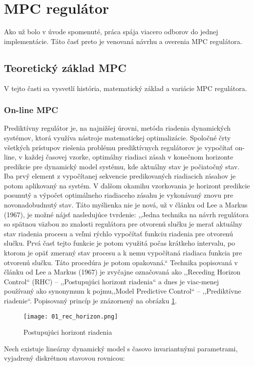 \section{MPC regulátor}
Ako už bolo v úvode spomenuté, práca spája viacero odborov do jednej implementácie. Táto časť preto je venovaná návrhu a overenia MPC regulátora.
\subsection{Teoretický základ MPC}
V tejto časti sa vysvetlí história, matematický základ a variácie MPC regulátora.
\subsubsection{On-line MPC}
Prediktívny regulátor je, na najnižšej úrovni, metóda riadenia dynamických systémov, ktorá využíva nástroje matematickej optimalizácie. Spoločné črty všetkých prístupov riešenia problému prediktívnych regulátorov je vypočítať on-line, v každej časovej vzorke,  optimálny riadiaci zásah v konečnom horizonte predikcie pre dynamický model systému, kde aktuálny stav je počiatočný stav. Iba prvý element z vypočítanej sekvencie predikovaných riadiacich zásahov je potom aplikovaný na systém. V ďalšom okamihu vzorkovania je horizont predikcie posunutý a výpočet optimálneho riadiaceho zásahu je vykonávaný znovu pre novonadobudnutý stav. Táto myšlienka nie je nová, už v článku od Lee a Markus (1967), je možné nájsť nasledujúce tvrdenie: ,,Jedna technika na návrh regulátora so spätnou väzbou zo znalosti regulátora pre otvorenú slučku je merať aktuálny stav riadenia procesu a veľmi rýchlo vypočítať funkciu riadenia pre otvorenú slučku. Prvá časť tejto funkcie je potom využitá počas krátkeho intervalu, po ktorom je opäť zmeraný stav procesu a k nemu vypočítaná riadiaca funkcia pre otvorenú slučku. Táto procedúra je potom opakovaná.`` Technika popisovaná v článku od Lee a Markus (1967) je zvyčajne označovaná ako ,,Receding Horizon Control`` (RHC) – ,,Postupujúci horizont riadenia`` a dnes je viac-menej používaný ako synonymum k pojmu,,Model Predictive Control`` – ,,Prediktívne riadenie``. \cite{MPC03} Popisovaný princíp je znázornený na obrázku \ref{01_rec_horizon}.
\begin{figure}[h]
\centering
\texttt{[image: 01\_rec\_horizon.png]}
\caption{Postupujúci horizont riadenia}
\label{01_rec_horizon}
\end{figure}
Nech existuje lineárny dynamický model s časovo invariantnými parametrami, vyjadrený diskrétnou stavovou rovnicou:
